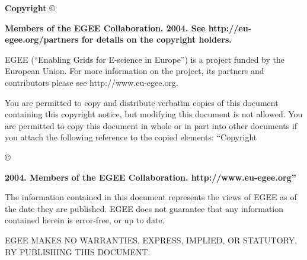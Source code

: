 %
%
\vfill{\bf Copyright }\copyright{\bf Members of the EGEE Collaboration. 2004. 
See http://eu-egee.org/partners for details on the copyright holders. 

EGEE (``Enabling Grids for E-science in Europe'') is a project funded by
the European Union.  For more information on the project, its partners
and contributors please see http://www.eu-egee.org.

You are permitted to copy and distribute verbatim copies of this
document containing this copyright notice, but modifying this document
is not allowed. You are permitted to copy this document in whole or in
part into other documents if you attach the following reference to the
copied elements: ``Copyright }\copyright{\bf 2004. Members of the EGEE
Collaboration. http://www.eu-egee.org''

The information contained in this document represents the views of
EGEE as of the date they are published. EGEE does not guarantee that
any information contained herein is error-free, or up to date.

EGEE MAKES NO WARRANTIES, EXPRESS, IMPLIED, OR STATUTORY, BY
PUBLISHING THIS DOCUMENT.}

